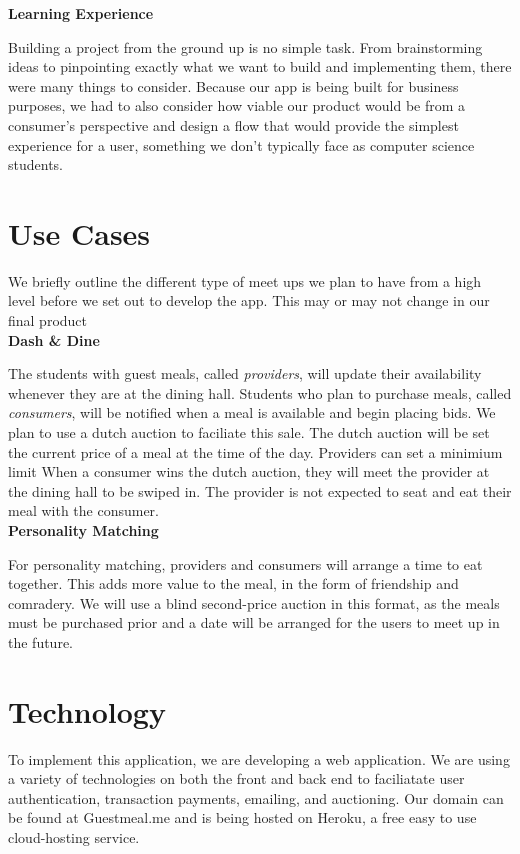 \documentclass[column,12pt]{article}
\begin{document}
\textbf{Learning Experience}

Building a project from the ground up is no simple task. From brainstorming ideas to pinpointing exactly what we want to build and implementing them, there were many things to consider. Because our app is being built for business purposes, we had to also consider how viable our product would be from a consumer's perspective and design a flow that would provide the simplest experience for a user, something we don't typically face as computer science students. 


\section{Use Cases}
We briefly outline the different type of meet ups we plan to have from a high level before we set out to develop the app. This may or may not change in our final product \\

\textbf{Dash \& Dine}

The students with guest meals, called {\it providers}, will update their availability whenever they are at the dining hall. Students who plan to purchase meals, called {\it consumers}, will be notified when a meal is available and begin placing bids. We plan to use a dutch auction to faciliate this sale. The dutch auction will be set the current price of a meal at the time of the day. Providers can set a minimium limit When a consumer wins the dutch auction,
they will meet the provider at the dining hall to be swiped in. The provider is not expected to seat and eat their meal with the consumer. \\

\textbf{Personality Matching}

For personality matching, providers and consumers will arrange a time to eat together. This adds more value to the meal, in the form of friendship and comradery. We will use a blind second-price auction in this format, as the meals must be purchased prior and a date will be arranged for the users to meet up in the future. 


\section{Technology}
To implement this application, we are developing a web application. We are using a variety of technologies on both the front and back end to faciliatate user authentication, transaction payments, emailing, and auctioning. Our domain can be found at Guestmeal.me and is being hosted on Heroku, a free easy to use cloud-hosting service. \\
\end{document}
